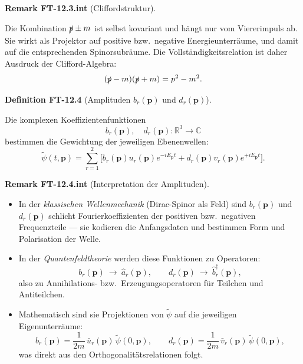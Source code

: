 \documentclass[10pt, letterpaper]{article}
\newcommand{\R}{\mathbb{R}}
\newcommand{\C}{\mathbb{C}}
\newcommand{\CustomHeading}[3]{%
  \par\medskip\noindent%
  \textbf{#1 #2} \textnormal{(#3)}.\enskip%
}
\newenvironment{DEF}[2]{\begin{unitbox}\CustomHeading{Definition}{#1}{#2}}{\end{unitbox}}
\newenvironment{REM}[2]{\begin{unitbox}\CustomHeading{Remark}{#1}{#2}}{\end{unitbox}}
\begin{document}
\begin{REM}{FT-12.3.int}{Cliffordstruktur}
Die Kombination $\slashed p\pm m$ ist selbst kovariant und hängt nur vom Viererimpuls ab. Sie wirkt als Projektor auf positive bzw.\ negative Energieunterräume, und damit auf die entsprechenden Spinorsubräume. Die Vollständigkeitsrelation ist daher Ausdruck der Clifford-Algebra:
\[
 (\slashed p - m)(\slashed p + m)=p^2 - m^2.
\]
\end{REM}

\begin{DEF}{FT-12.4}{Amplituden $b_r(\mathbf p)$ und $d_r(\mathbf p)$}
Die komplexen Koeffizientenfunktionen
\[
 b_r(\mathbf p),\quad d_r(\mathbf p):\R^3\to\C
\]
bestimmen die Gewichtung der jeweiligen Ebenenwellen:
\[
 \tilde\psi(t,\mathbf p)
  =\sum_{r=1}^2\Big[b_r(\mathbf p)u_r(\mathbf p)e^{-iE_{\mathbf p}t}
                    +d_r(\mathbf p)v_r(\mathbf p)e^{+iE_{\mathbf p}t}\Big].
\]
\end{DEF}

\begin{REM}{FT-12.4.int}{Interpretation der Amplituden}
\begin{itemize}
\item In der \emph{klassischen Wellenmechanik} (Dirac-Spinor als Feld) sind $b_r(\mathbf p)$ und $d_r(\mathbf p)$ schlicht Fourierkoeffizienten der positiven bzw.\ negativen Frequenzteile — sie kodieren die Anfangsdaten und bestimmen Form und Polarisation der Welle.
\item In der \emph{Quantenfeldtheorie} werden diese Funktionen zu Operatoren:
  \[
    b_r(\mathbf p)\ \longrightarrow\ \hat a_r(\mathbf p),\qquad
    d_r(\mathbf p)\ \longrightarrow\ \hat b_r^\dagger(\mathbf p),
  \]
  also zu Annihilations- bzw.\ Erzeugungsoperatoren für Teilchen und Antiteilchen.
\item Mathematisch sind sie Projektionen von $\tilde\psi$ auf die jeweiligen Eigenunterräume:
  \[
    b_r(\mathbf p)=\frac{1}{2m}\,\bar u_r(\mathbf p)\,\tilde\psi(0,\mathbf p),\qquad
    d_r(\mathbf p)=\frac{1}{2m}\,\bar v_r(\mathbf p)\,\tilde\psi(0,\mathbf p),
  \]
  was direkt aus den Orthogonalitätsrelationen folgt.
\end{itemize}
\end{REM}
\end{document}
